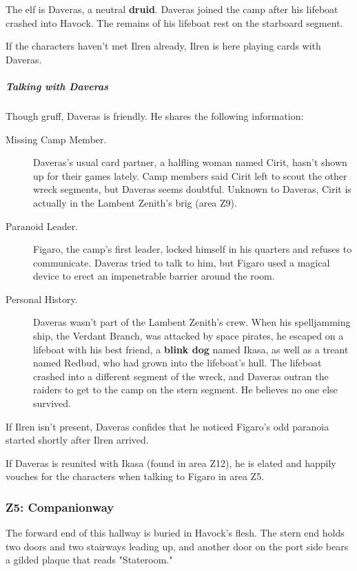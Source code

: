 \documentclass[10pt,a4paper,twoside,bg=print,twocolumn,openany,nodeprecatedcode]{dndbook}
\begin{document}
The elf is Daveras, a neutral \textbf{druid}. Daveras joined the camp after his lifeboat crashed into Havock. The remains of his lifeboat rest on the starboard segment.

If the characters haven't met Ilren already, Ilren is here playing cards with Daveras.

\subparagraph{Talking with Daveras}
Though gruff, Daveras is friendly. He shares the following information:


\begin{description}
\item[Missing Camp Member.]
Daveras's usual card partner, a halfling woman named Cirit, hasn't shown up for their games lately. Camp members said Cirit left to scout the other wreck segments, but Daveras seems doubtful. Unknown to Daveras, Cirit is actually in the Lambent Zenith's brig (area Z9).
\item[Paranoid Leader.]
Figaro, the camp's first leader, locked himself in his quarters and refuses to communicate. Daveras tried to talk to him, but Figaro used a magical device to erect an impenetrable barrier around the room.
\item[Personal History.]
Daveras wasn't part of the Lambent Zenith's crew. When his spelljamming ship, the Verdant Branch, was attacked by space pirates, he escaped on a lifeboat with his best friend, a \textbf{blink dog} named Ikasa, as well as a treant named Redbud, who had grown into the lifeboat's hull. The lifeboat crashed into a different segment of the wreck, and Daveras outran the raiders to get to the camp on the stern segment. He believes no one else survived.
\end{description}

If Ilren isn't present, Daveras confides that he noticed Figaro's odd paranoia started shortly after Ilren arrived.

If Daveras is reunited with Ikasa (found in area Z12), he is elated and happily vouches for the characters when talking to Figaro in area Z5.

\subsubsection{Z5: Companionway}
\begin{DndReadAloud}{}
The forward end of this hallway is buried in Havock's flesh. The stern end holds two doors and two stairways leading up, and another door on the port side bears a gilded plaque that reads "Stateroom."

\end{DndReadAloud}
\end{document}
